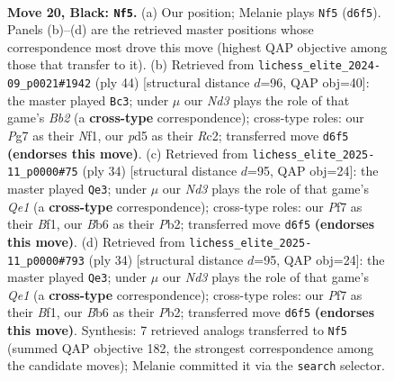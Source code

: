 \documentclass[11pt]{article}
\begin{document}
\begin{figure}[p]\centering
\begin{subfigure}{0.46\textwidth}\centering
\resizebox{\linewidth}{!}{%
\newchessgame
\chessboard[
  setfen={r1b3k1/pppp1pp1/1b1n1q1p/3P4/6B1/2N4P/PPP2PP1/R1B1Q1K1 b - - 3 20},
  showmover=false,
  pgfstyle=straightmove, color=movearrow, markmove={d6-f5}
]}
\caption{}
\end{subfigure}\hfill
\begin{subfigure}{0.46\textwidth}\centering
\resizebox{\linewidth}{!}{%
\newchessgame
\chessboard[
  setfen={6k1/ppnqrb1p/2p2ppb/2Pp4/1P1P4/P2B1Q2/1BR2PPP/5NK1 w - - 0 23},
  showmover=false,
  pgfstyle=straightmove, color=movearrow, markmove={b2-c3}
]}
\caption{}
\end{subfigure}
\\[4pt]
\begin{subfigure}{0.46\textwidth}\centering
\resizebox{\linewidth}{!}{%
\newchessgame
\chessboard[
  setfen={r2q2k1/p1p2pp1/1p1n1b1p/3p1b2/3P1B2/2PN4/PP3PPP/R3QBK1 w - - 0 18},
  showmover=false,
  pgfstyle=straightmove, color=movearrow, markmove={e1-e3}
]}
\caption{}
\end{subfigure}\hfill
\begin{subfigure}{0.46\textwidth}\centering
\resizebox{\linewidth}{!}{%
\newchessgame
\chessboard[
  setfen={r2q2k1/p1p2pp1/1p1n1b1p/3p1b2/3P1B2/2PN4/PP3PPP/R3QBK1 w - - 0 18},
  showmover=false,
  pgfstyle=straightmove, color=movearrow, markmove={e1-e3}
]}
\caption{}
\end{subfigure}
\caption{\textbf{Move 20, Black: \texttt{Nf5}.} (a) Our position; Melanie plays \texttt{Nf5} (\texttt{d6f5}). Panels (b)--(d) are the retrieved master positions whose correspondence most drove this move (highest QAP objective among those that transfer to it). (b) Retrieved from \texttt{lichess\_elite\_2024-09\_p0021\#1942} (ply 44) [structural distance $d$=96, QAP obj=40]: the master played \texttt{Bc3}; under $\mu$ our \emph{Nd3} plays the role of that game's \emph{Bb2} (a \textbf{cross-type} correspondence); cross-type roles: our \emph{P}g7 as their \emph{N}f1, our \emph{p}d5 as their \emph{R}c2; transferred move \texttt{d6f5} \textbf{(endorses this move)}. (c) Retrieved from \texttt{lichess\_elite\_2025-11\_p0000\#75} (ply 34) [structural distance $d$=95, QAP obj=24]: the master played \texttt{Qe3}; under $\mu$ our \emph{Nd3} plays the role of that game's \emph{Qe1} (a \textbf{cross-type} correspondence); cross-type roles: our \emph{P}f7 as their \emph{B}f1, our \emph{B}b6 as their \emph{P}b2; transferred move \texttt{d6f5} \textbf{(endorses this move)}. (d) Retrieved from \texttt{lichess\_elite\_2025-11\_p0000\#793} (ply 34) [structural distance $d$=95, QAP obj=24]: the master played \texttt{Qe3}; under $\mu$ our \emph{Nd3} plays the role of that game's \emph{Qe1} (a \textbf{cross-type} correspondence); cross-type roles: our \emph{P}f7 as their \emph{B}f1, our \emph{B}b6 as their \emph{P}b2; transferred move \texttt{d6f5} \textbf{(endorses this move)}. Synthesis: 7 retrieved analogs transferred to \texttt{Nf5} (summed QAP objective 182, the strongest correspondence among the candidate moves); Melanie committed it via the \texttt{search} selector.}
\label{fig:thought-m39}
\end{figure}
\end{document}
